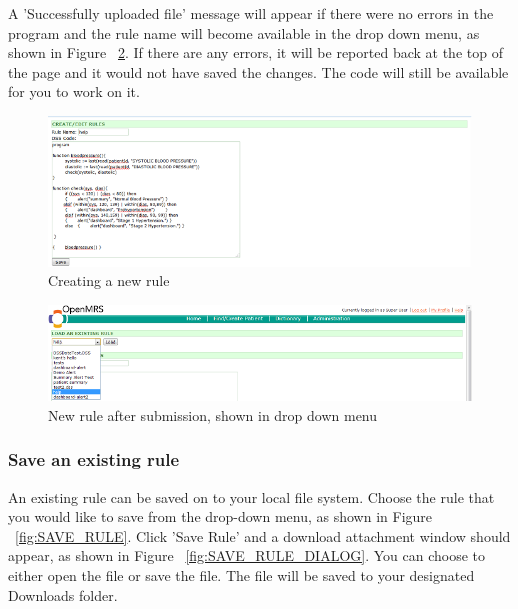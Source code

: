 \documentclass[12pt,letterpaper]{article}
\begin{document}
A 'Successfully uploaded file' message will appear if there were no errors in the program and the rule name will become available in the drop down menu, as shown in Figure ~\ref{fig:NEW_RULE_SUCCESS}.
If there are any errors, it will be reported back at the top of the page and it would not have saved the changes. The code will still be available for you to work on it.

\begin{figure}[htbp]
\begin{center}
\includegraphics[width=6.5in]{user_guide/new_rule.png}
\end{center}
\caption{Creating a new rule}
\label{fig:NEW_RULE}
\end{figure}

\begin{figure}[htbp]
\begin{center}
\includegraphics[width=6.5in]{user_guide/new_rule_success.png}
\end{center}
\caption{New rule after submission, shown in drop down menu}
\label{fig:NEW_RULE_SUCCESS}
\end{figure}

\newpage
\subsubsection{Save an existing rule} \label{sec:SAVE_RULE}
An existing rule can be saved on to your local file system. Choose the rule that you would like to save from the drop-down menu,  as shown in Figure ~\ref{fig:SAVE_RULE}.
Click 'Save Rule' and a download attachment window should appear, 
as shown in Figure ~\ref{fig:SAVE_RULE_DIALOG}. You can choose to either open the file or save the file. The file will be saved to your designated Downloads folder.
\end{document}
